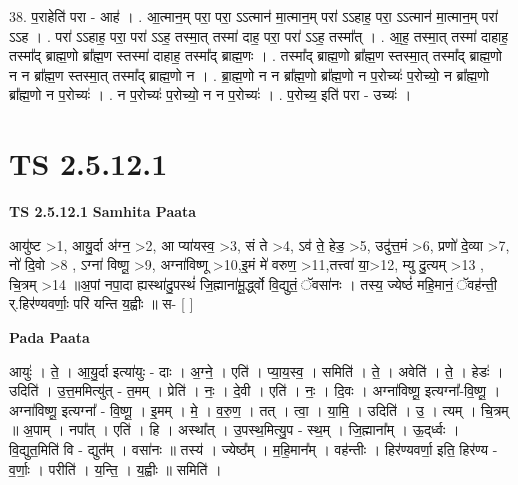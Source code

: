 \documentclass[17pt]{extarticle}
\begin{document}
38. प॒राहेति॑ परा - आह॑ । . आ॒त्मान॒म् परा॒ परा॒ ऽऽत्मान॑ मा॒त्मान॒म् परा॑ ऽऽहाह॒ परा॒ ऽऽत्मान॑ मा॒त्मान॒म् परा॑ ऽऽह । . परा॑ ऽऽहाह॒ परा॒ परा॑ ऽऽह॒ तस्मा॒त् तस्मा॑ दाह॒ परा॒ परा॑ ऽऽह॒ तस्मा᳚त् । . आ॒ह॒ तस्मा॒त् तस्मा॑ दाहाह॒ तस्मा᳚द् ब्राह्म॒णो ब्रा᳚ह्म॒ण स्तस्मा॑ दाहाह॒ तस्मा᳚द् ब्राह्म॒णः । . तस्मा᳚द् ब्राह्म॒णो ब्रा᳚ह्म॒ण स्तस्मा॒त् तस्मा᳚द् ब्राह्म॒णो न न ब्रा᳚ह्म॒ण स्तस्मा॒त् तस्मा᳚द् ब्राह्म॒णो न । . ब्रा॒ह्म॒णो न न ब्रा᳚ह्म॒णो ब्रा᳚ह्म॒णो न प॒रोच्यः॑ प॒रोच्यो॒ न ब्रा᳚ह्म॒णो ब्रा᳚ह्म॒णो न प॒रोच्यः॑ । . न प॒रोच्यः॑ प॒रोच्यो॒ न न प॒रोच्यः॑ । . प॒रोच्य॒ इति॑ परा - उच्यः॑ । \newline
\pagebreak
{}
\section*{ TS 2.5.12.1 }

\textbf{TS 2.5.12.1 } \newline
\textbf{Samhita Paata} \newline

आयु॑ष्ट >1, आयु॒र्दा अ॑ग्न॒ >2, आ प्या॑यस्व॒ >3, सं ते >4, ऽव॑ ते॒ हेड॒ >5, उदु॑त्त॒मं >6, प्रणो॑ दे॒व्या >7, नो॑ दि॒वो >8 , ऽग्ना॑ विष्णू॒ >9, अग्ना॑विष्णू >10,इ॒मं मे॑ वरुण॒ >11,तत्त्वा॑ या॒>12, म्यु दु॒त्यम् >13 , चि॒त्रम् >14 ॥अ॒पां नपा॒दा ह्यस्था॑दु॒पस्थं॑ जि॒ह्माना॑मू॒र्द्ध्वो वि॒द्युतं॒ ॅवसा॑नः । तस्य॒ ज्येष्ठं॑ महि॒मानं॒ ॅवह॑न्ती॒ र्.हिर॑ण्यवर्णाः॒ परि॑ यन्ति य॒ह्वीः ॥ स-  [  ] \newline

\textbf{Pada Paata} \newline

आयुः॑ । ते॒ । आ॒यु॒र्दा इत्या॑युः - दाः । अ॒ग्ने॒ । एति॑ । प्या॒य॒स्व॒ । समिति॑ । ते॒ । अवेति॑ । ते॒ । हेडः॑ । उदिति॑ । उ॒त्त॒ममित्यु॑त् - त॒मम् । प्रेति॑ । नः॒ । दे॒वी । एति॑ । नः॒ । दि॒वः । अग्ना॑विष्णू॒ इत्यग्ना᳚-वि॒ष्णू॒ । अग्ना॑विष्णू॒ इत्यग्ना᳚ - वि॒ष्णू॒ । इ॒मम् । मे॒ । व॒रु॒ण॒ । तत् । त्वा॒ । या॒मि॒ । उदिति॑ । उ॒ । त्यम् । चि॒त्रम् ॥ अ॒पाम् । नपा᳚त् । एति॑ । हि । अस्था᳚त् । उ॒पस्थ॒मित्यु॒प - स्थ॒म् । जि॒ह्माना᳚म् । ऊ॒द्‌र्ध्वः । वि॒द्युत॒मिति॑ वि - द्युत᳚म् । वसा॑नः ॥ तस्य॑ । ज्येष्ठ᳚म् । म॒हि॒मान᳚म् । वह॑न्तीः । हिर॑ण्यवर्णा॒ इति॒ हिर॑ण्य - व॒र्णाः॒ । परीति॑ । य॒न्ति॒ । य॒ह्वीः ॥ समिति॑ ।  \newline
\end{document}
